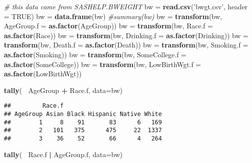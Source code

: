 \documentclass[]{article}
\newenvironment{Shaded}{\begin{snugshade}}{\end{snugshade}}
\newcommand{\KeywordTok}[1]{\textcolor[rgb]{0.13,0.29,0.53}{\textbf{#1}}}
\newcommand{\DataTypeTok}[1]{\textcolor[rgb]{0.13,0.29,0.53}{#1}}
\newcommand{\StringTok}[1]{\textcolor[rgb]{0.31,0.60,0.02}{#1}}
\newcommand{\CommentTok}[1]{\textcolor[rgb]{0.56,0.35,0.01}{\textit{#1}}}
\newcommand{\OtherTok}[1]{\textcolor[rgb]{0.56,0.35,0.01}{#1}}
\newcommand{\OperatorTok}[1]{\textcolor[rgb]{0.81,0.36,0.00}{\textbf{#1}}}
\newcommand{\NormalTok}[1]{#1}
\begin{document}
\begin{Shaded}
\begin{Highlighting}[]
\CommentTok{# this data came from SASHELP.BWEIGHT}
\NormalTok{bw =}\StringTok{ }\KeywordTok{read.csv}\NormalTok{(}\StringTok{'bwgt.csv'}\NormalTok{, }\DataTypeTok{header =} \OtherTok{TRUE}\NormalTok{)}
\NormalTok{bw =}\StringTok{ }\KeywordTok{data.frame}\NormalTok{(bw)}
\CommentTok{#summary(bw)}
\NormalTok{bw =}\StringTok{ }\KeywordTok{transform}\NormalTok{(bw, }\DataTypeTok{AgeGroup.f =} \KeywordTok{as.factor}\NormalTok{(AgeGroup))}
\NormalTok{bw =}\StringTok{ }\KeywordTok{transform}\NormalTok{(bw, }\DataTypeTok{Race.f =} \KeywordTok{as.factor}\NormalTok{(Race))}
\NormalTok{bw =}\StringTok{ }\KeywordTok{transform}\NormalTok{(bw, }\DataTypeTok{Drinking.f =} \KeywordTok{as.factor}\NormalTok{(Drinking))}
\NormalTok{bw =}\StringTok{ }\KeywordTok{transform}\NormalTok{(bw, }\DataTypeTok{Death.f =} \KeywordTok{as.factor}\NormalTok{(Death))}
\NormalTok{bw =}\StringTok{ }\KeywordTok{transform}\NormalTok{(bw, }\DataTypeTok{Smoking.f =} \KeywordTok{as.factor}\NormalTok{(Smoking))}
\NormalTok{bw =}\StringTok{ }\KeywordTok{transform}\NormalTok{(bw, }\DataTypeTok{SomeCollege.f =} \KeywordTok{as.factor}\NormalTok{(SomeCollege))}
\NormalTok{bw =}\StringTok{ }\KeywordTok{transform}\NormalTok{(bw, }\DataTypeTok{LowBirthWgt.f =} \KeywordTok{as.factor}\NormalTok{(LowBirthWgt))}
\end{Highlighting}
\end{Shaded}

\begin{Shaded}
\begin{Highlighting}[]
\KeywordTok{tally}\NormalTok{(}\OperatorTok{~}\StringTok{ }\NormalTok{AgeGroup }\OperatorTok{+}\StringTok{ }\NormalTok{Race.f, }\DataTypeTok{data=}\NormalTok{bw)}
\end{Highlighting}
\end{Shaded}

\begin{verbatim}
##         Race.f
## AgeGroup Asian Black Hispanic Native White
##        1     8    91       83      6   169
##        2   101   375      475     22  1337
##        3    36    52       66      4   264
\end{verbatim}

\begin{Shaded}
\begin{Highlighting}[]
\KeywordTok{tally}\NormalTok{(}\OperatorTok{~}\StringTok{ }\NormalTok{Race.f }\OperatorTok{|}\StringTok{ }\NormalTok{AgeGroup.f, }\DataTypeTok{data=}\NormalTok{bw)}
\end{Highlighting}
\end{Shaded}
\end{document}
